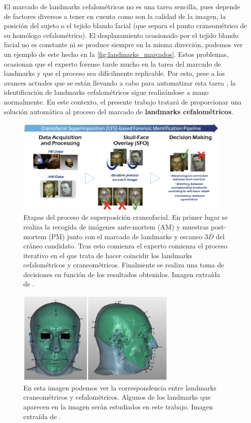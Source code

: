    \noindent El marcado de landmarks cefalométricos no es una tarea sencilla, pues depende de factores diversos a tener en cuenta como son la calidad de la imagen, la posición del sujeto o el tejido blando facial (que separa el punto craneométrico de su homólogo cefalométrico). El desplazamiento ocasionado por el tejido blando facial no es constante ni se produce siempre en la misma dirección, podemos ver un ejemplo de este hecho en la \autoref{fig:landmarks_marcados}. Estos problemas, ocasionan que el experto forense tarde mucho en la tarea del marcado de landmarks y que el proceso sea difícilmente replicable. Por esto, pese a los avances actuales que se están llevando a cabo para automatizar esta tarea \cite{Huete2015PastPA}, la identificación de landmarks cefalométricos sigue realizándose a mano normalmente. En este contexto, el presente trabajo tratará de proporcionar una solución automática al proceso del marcado de \textbf{landmarks cefalométricos}.
    \begin{figure}[H]
        \centering
        \includegraphics[width=0.95\textwidth]{img/SCF.png}
        \caption{Etapas del proceso de superposición craneofacial. En primer lugar se realiza la recogida de imágenes ante-mortem (AM) y muestras post-mortem (PM) junto con el marcado de landmarks y escaneo $3D$ del cráneo candidato. Tras esto comienza el experto comienza el proceso iterativo en el que trata de hacer coincidir los landmarks cefalométricos y craneométricos. Finalmente se realiza una toma de decisiones en función de los resultados obtenidos. Imagen extraída de \cite{article}.}
        \label{fig:procesoSCF}
    \end{figure}
    \begin{figure}[H]
        \centering
        \includegraphics[width=0.7\textwidth]{img/marcado_landmarks.png}
        \caption{En esta imagen podemos ver la correspondencia entre landmarks craneométricos y cefalométricos. Algunos de los landmarks que aparecen en la imagen serán estudiados en este trabajo. Imagen extraída de \cite{damas2020handbook}.}
        \label{fig:landmarks_marcados}
    \end{figure}

